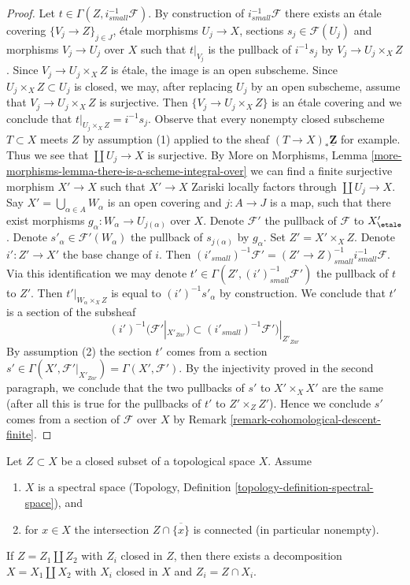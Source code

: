 \begin{proof}
\medskip\noindent
Let $t \in \Gamma(Z, i^{-1}_{small}\mathcal{F})$. By construction of
$i^{-1}_{small}\mathcal{F}$ there exists an \'etale covering
$\{V_j \to Z\}_{j \in J}$, \'etale morphisms $U_j \to X$, sections
$s_j \in \mathcal{F}(U_j)$ and morphisms $V_j \to U_j$ over $X$
such that $t|_{V_j}$ is the pullback of $i^{-1}s_j$ by
$V_j \to U_j \times_X Z$. Since $V_j \to U_j \times_X Z$ is \'etale,
the image is an open subscheme. Since $U_j \times_X Z \subset U_j$ is
closed, we may, after replacing $U_j$ by an open subscheme, assume
that $V_j \to U_j \times_X Z$ is surjective. Then $\{V_j \to U_j \times_X Z\}$
is an \'etale covering and we conclude that $t|_{U_j \times_X Z} = i^{-1}s_j$.
Observe that every nonempty closed subscheme $T \subset X$ meets $Z$
by assumption (1) applied to the sheaf $(T \to X)_*\underline{\mathbf{Z}}$
for example. Thus we see that $\coprod U_j \to X$ is surjective.
By More on Morphisms, Lemma
\ref{more-morphisms-lemma-there-is-a-scheme-integral-over}
we can find a finite surjective morphism $X' \to X$
such that $X' \to X$ Zariski locally factors through $\coprod U_j \to X$.
Say $X' = \bigcup_{\alpha \in A} W_\alpha$ is an open covering
and $j : A \to J$ is a map, such that there exist morphisms
$g_\alpha : W_\alpha \to U_{j(\alpha)}$ over $X$. Denote
$\mathcal{F}'$ the pullback of $\mathcal{F}$ to $X'_\etale$.
Denote $s'_\alpha \in \mathcal{F}'(W_\alpha)$ the pullback
of $s_{j(\alpha)}$ by $g_\alpha$.
Set $Z' = X' \times_X Z$. Denote $i' : Z' \to X'$
the base change of $i$. Then $(i'_{small})^{-1}\mathcal{F}' =
(Z' \to Z)_{small}^{-1}i_{small}^{-1}\mathcal{F}$. Via this identification
we may denote $t' \in
\Gamma(Z', (i')^{-1}_{small}\mathcal{F}')$
the pullback of $t$ to $Z'$.
Then $t'|_{W_\alpha \times_X Z}$ is equal to $(i')^{-1}s'_\alpha$ by
construction. We conclude that $t'$ is a section of
the subsheaf
$$
(i')^{-1}(\mathcal{F}'|_{X'_{Zar}})
\subset
(i'_{small})^{-1}\mathcal{F}')|_{Z'_{Zar}}
$$
By assumption (2) the section $t'$ comes from a section
$s' \in \Gamma(X', \mathcal{F}'|_{X'_{Zar}}) = \Gamma(X', \mathcal{F}')$.
By the injectivity proved in the second paragraph,
we conclude that the two pullbacks of $s'$ to
$X' \times_X X'$ are the same (after all this is true for
the pullbacks of $t'$ to $Z' \times_Z Z'$). Hence we conclude
$s'$ comes from a section of $\mathcal{F}$ over $X$ by
Remark \ref{remark-cohomological-descent-finite}.
\end{proof}

\begin{lemma}
\label{lemma-connected-topological}
Let $Z \subset X$ be a closed subset of a topological space $X$.
Assume
\begin{enumerate}
\item $X$ is a spectral space
(Topology, Definition \ref{topology-definition-spectral-space}), and
\item for $x \in X$ the intersection $Z \cap \overline{\{x\}}$
is connected (in particular nonempty).
\end{enumerate}
If $Z = Z_1 \amalg Z_2$ with $Z_i$ closed in $Z$,
then there exists a decomposition $X = X_1 \amalg X_2$ with
$X_i$ closed in $X$ and $Z_i = Z \cap X_i$.
\end{lemma}

